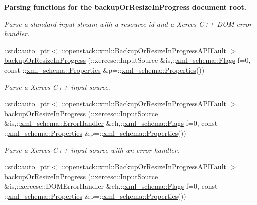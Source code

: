 \begin{Indent}{\bf Parsing functions for the backupOrResizeInProgress document root.}
\begin{DoxyCompactItemize}
\begin{DoxyCompactList}\small\item\em Parse a standard input stream with a resource id and a Xerces-\/C++ DOM error handler. \item\end{DoxyCompactList}\item 
::std::auto\_\-ptr$<$ ::\hyperlink{classopenstack_1_1xml_1_1BackupOrResizeInProgressAPIFault}{openstack::xml::BackupOrResizeInProgressAPIFault} $>$ \hyperlink{namespaceopenstack_1_1xml_a136317eab3ce9a933e4344f2cc5b2f0e}{backupOrResizeInProgress} (::xercesc::InputSource \&is,::\hyperlink{namespacexml__schema_affb4c227cbd9aa7453dd1dc5a1401943}{xml\_\-schema::Flags} f=0, const ::\hyperlink{namespacexml__schema_ad27ce19a7ee1d3b1064092648898f64c}{xml\_\-schema::Properties} \&p=::\hyperlink{namespacexml__schema_ad27ce19a7ee1d3b1064092648898f64c}{xml\_\-schema::Properties}())
\begin{DoxyCompactList}\small\item\em Parse a Xerces-\/C++ input source. \item\end{DoxyCompactList}\item 
::std::auto\_\-ptr$<$ ::\hyperlink{classopenstack_1_1xml_1_1BackupOrResizeInProgressAPIFault}{openstack::xml::BackupOrResizeInProgressAPIFault} $>$ \hyperlink{namespaceopenstack_1_1xml_a1f5eaf5c5e246ff1183ed1c97b1adad0}{backupOrResizeInProgress} (::xercesc::InputSource \&is,::\hyperlink{namespacexml__schema_ab1c9361bfd3b404eaabf0c31eded79dc}{xml\_\-schema::ErrorHandler} \&eh,::\hyperlink{namespacexml__schema_affb4c227cbd9aa7453dd1dc5a1401943}{xml\_\-schema::Flags} f=0, const ::\hyperlink{namespacexml__schema_ad27ce19a7ee1d3b1064092648898f64c}{xml\_\-schema::Properties} \&p=::\hyperlink{namespacexml__schema_ad27ce19a7ee1d3b1064092648898f64c}{xml\_\-schema::Properties}())
\begin{DoxyCompactList}\small\item\em Parse a Xerces-\/C++ input source with an error handler. \item\end{DoxyCompactList}\item 
::std::auto\_\-ptr$<$ ::\hyperlink{classopenstack_1_1xml_1_1BackupOrResizeInProgressAPIFault}{openstack::xml::BackupOrResizeInProgressAPIFault} $>$ \hyperlink{namespaceopenstack_1_1xml_a2861cb4f505115c17e05b428e1049fab}{backupOrResizeInProgress} (::xercesc::InputSource \&is,::xercesc::DOMErrorHandler \&eh,::\hyperlink{namespacexml__schema_affb4c227cbd9aa7453dd1dc5a1401943}{xml\_\-schema::Flags} f=0, const ::\hyperlink{namespacexml__schema_ad27ce19a7ee1d3b1064092648898f64c}{xml\_\-schema::Properties} \&p=::\hyperlink{namespacexml__schema_ad27ce19a7ee1d3b1064092648898f64c}{xml\_\-schema::Properties}())

\end{DoxyCompactItemize}
\end{Indent}
